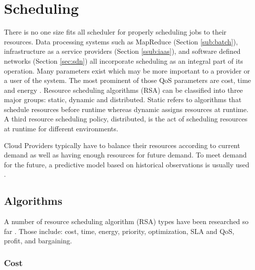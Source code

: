 \documentclass[12pt]{article}
\begin{document}





\section{Scheduling} \label{sec:scheduling}

There is no one size fits all scheduler for properly scheduling jobs to their resources. Data processing systems such as MapReduce (Section \ref{sub:batch}), infrastructure as a service providers (Section \ref{ssub:iaas}), and software defined networks (Section \ref{sec:sdn}) all incorporate scheduling as an integral part of its operation. Many parameters exist which may be more important to a provider or a user of the system. The most prominent of those QoS parameters are cost, time and energy \cite{Singh2016}. Resource scheduling algorithms (RSA) can be classified into three major groups: static, dynamic and distributed. Static refers to algorithms that schedule resources before runtime whereas dynamic assigns resources at runtime. A third resource scheduling policy, distributed, is the act of scheduling resources at runtime for different environments.


Cloud Providers typically have to balance their resources according to current demand as well as having enough resources for future demand. To meet demand for the future, a predictive model based on historical observations is usually used \cite{Jennings2015}.

\subsection{Algorithms} \label{sub:schedalgorithms}

A number of resource scheduling algorithm (RSA) types have been researched so far \cite{Singh2016}. Those include: cost, time, energy, priority, optimization, SLA and QoS, profit, and bargaining.


\subsubsection{Cost} \label{ssub:algCost}
\end{document}
